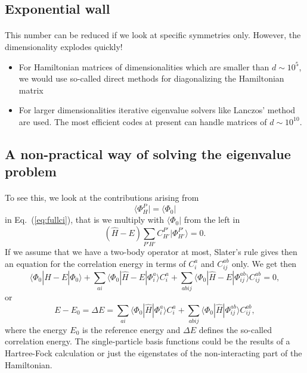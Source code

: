 \documentclass[%
oneside,                 %
final,                   %
10pt]{article}
\begin{document}
\subsection*{Exponential wall}

\paragraph{}
This number can be reduced if we look at specific symmetries only. However, the dimensionality explodes quickly!

\begin{itemize}
\item For Hamiltonian matrices of dimensionalities  which are smaller than $d\sim 10^5$, we would use so-called direct methods for diagonalizing the Hamiltonian matrix

\item For larger dimensionalities iterative eigenvalue solvers like Lanczos' method are used. The most efficient codes at present can handle matrices of $d\sim 10^{10}$. 
\end{itemize}

\noindent



\subsection*{A non-practical way of solving the eigenvalue problem}

\paragraph{}
To see this, we look at the contributions arising from 
\[
\langle \Phi_H^P | = \langle \Phi_0|
\]
in  Eq.~(\ref{eq:fullci}), that is we multiply with $\langle \Phi_0 |$
from the left in 
\[
(\hat{H} -E)\sum_{P'H'}C_{H'}^{P'}|\Phi_{H'}^{P'} \rangle=0. 
\]
If we assume that we have a two-body operator at most, Slater's rule gives then an equation for the 
correlation energy in terms of $C_i^a$ and $C_{ij}^{ab}$ only.  We get then
\[
\langle \Phi_0 | \hat{H} -E| \Phi_0\rangle + \sum_{ai}\langle \Phi_0 | \hat{H} -E|\Phi_{i}^{a} \rangle C_{i}^{a}+
\sum_{abij}\langle \Phi_0 | \hat{H} -E|\Phi_{ij}^{ab} \rangle C_{ij}^{ab}=0,
\]
or 
\[
E-E_0 =\Delta E=\sum_{ai}\langle \Phi_0 | \hat{H}|\Phi_{i}^{a} \rangle C_{i}^{a}+
\sum_{abij}\langle \Phi_0 | \hat{H}|\Phi_{ij}^{ab} \rangle C_{ij}^{ab},
\]
where the energy $E_0$ is the reference energy and $\Delta E$ defines the so-called correlation energy.
The single-particle basis functions  could be the results of a Hartree-Fock calculation or just the eigenstates of the non-interacting part of the Hamiltonian.
\end{document}
